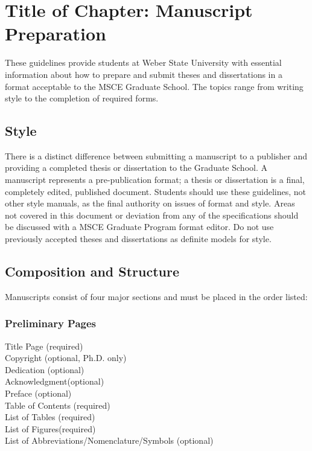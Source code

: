 

\chapter{Title of Chapter: Manuscript Preparation} \label{CH1_Introduction}
These guidelines provide students at Weber State University with essential information about how to prepare and submit theses and dissertations in a format acceptable to the MSCE Graduate School. The topics range from writing style to the completion of required forms. 


\section{Style}
There is a distinct difference between submitting a manuscript to a publisher and providing a completed thesis or dissertation to the Graduate School. A manuscript represents a pre-publication format; a thesis or dissertation is a final, completely edited, published document. Students should use these guidelines, not other style manuals, as the final authority on issues of format and style. Areas not covered in this document or deviation from any of the specifications should be discussed with a MSCE Graduate Program format editor. Do not use previously accepted theses and dissertations as definite models for style.

\section{Composition and Structure}
Manuscripts consist of four major sections and must be placed in the order listed:


\subsection{Preliminary Pages}
Title Page (required) \\
Copyright (optional, Ph.D. only) \\
Dedication (optional)  \\
Acknowledgment(optional) \\
Preface (optional) \\
Table of Contents (required) \\ 
List of Tables (required) \\
List of Figures(required) \\
List of Abbreviations/Nomenclature/Symbols (optional)


